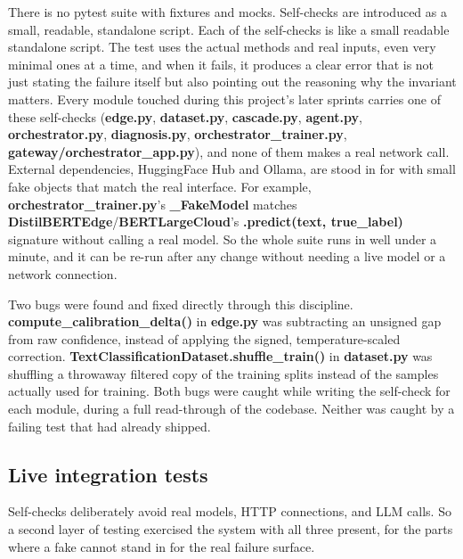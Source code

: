 There is no pytest suite with fixtures and mocks. Self-checks are
introduced as a small, readable, standalone script. Each of the self-checks
is like a small readable standalone script. The test uses the actual methods
and real inputs, even very minimal ones at a time, and when it fails, it produces
a clear error that is not just stating the failure itself but also
pointing out the reasoning why the invariant matters. Every module touched during
this project's later sprints carries one of these self-checks (\textbf{edge.py},
\textbf{dataset.py}, \textbf{cascade.py}, \textbf{agent.py},
\textbf{orchestrator.py}, \textbf{diagnosis.py},
\textbf{orchestrator\_trainer.py},
\textbf{gateway/orchestrator\_app.py}), and none of them makes a real
network call. External dependencies, HuggingFace Hub and Ollama, are
stood in for with small fake objects that match the real interface. For
example, \textbf{orchestrator\_trainer.py}'s \textbf{\_FakeModel}
matches \textbf{DistilBERTEdge}/\textbf{BERTLargeCloud}'s
\textbf{.predict(text, true\_label)} signature without calling a real
model. So the whole suite runs in well under a minute, and it can be
re-run after any change without needing a live model or a network
connection.

Two bugs were found and fixed directly through this discipline.
\textbf{compute\_calibration\_delta()} in \textbf{edge.py}
was subtracting an unsigned gap from raw confidence,
instead of applying the signed, temperature-scaled correction.
\textbf{TextClassificationDataset.shuffle\_train()} in
\textbf{dataset.py} was shuffling a throwaway filtered copy of the
training splits instead of the samples actually used for training. Both
bugs were caught while writing the self-check for each module, during a
full read-through of the codebase. Neither was caught by a failing test
that had already shipped.

\hypertarget{live-integration-tests}{%
\subsection{Live integration tests}\label{live-integration-tests}}

Self-checks deliberately avoid real models, HTTP connections, and LLM
calls. So a second layer of testing exercised the system with all three
present, for the parts where a fake cannot stand in for the real
failure surface.

